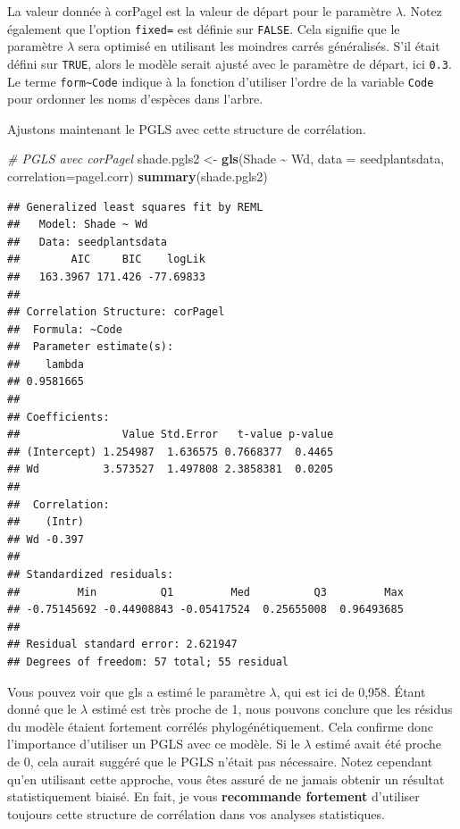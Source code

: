 \documentclass[
]{book}
\newenvironment{Shaded}{\begin{snugshade}}{\end{snugshade}}
\newcommand{\AttributeTok}[1]{\textcolor[rgb]{0.13,0.29,0.53}{#1}}
\newcommand{\CommentTok}[1]{\textcolor[rgb]{0.56,0.35,0.01}{\textit{#1}}}
\newcommand{\FunctionTok}[1]{\textcolor[rgb]{0.13,0.29,0.53}{\textbf{#1}}}
\newcommand{\NormalTok}[1]{#1}
\newcommand{\OtherTok}[1]{\textcolor[rgb]{0.56,0.35,0.01}{#1}}
\newcommand{\SpecialCharTok}[1]{\textcolor[rgb]{0.81,0.36,0.00}{\textbf{#1}}}
\begin{document}
La valeur donnée à corPagel est la valeur de départ pour le paramètre \(\lambda\). Notez également que l'option \texttt{fixed=} est définie sur \texttt{FALSE}. Cela signifie que le paramètre \(\lambda\) sera optimisé en utilisant les moindres carrés généralisés. S'il était défini sur \texttt{TRUE}, alors le modèle serait ajusté avec le paramètre de départ, ici \texttt{0.3}. Le terme \texttt{form\textasciitilde{}Code} indique à la fonction d'utiliser l'ordre de la variable \texttt{Code} pour ordonner les noms d'espèces dans l'arbre.

Ajustons maintenant le PGLS avec cette structure de corrélation.

\begin{Shaded}
\begin{Highlighting}[]
\CommentTok{\# PGLS avec corPagel}
\NormalTok{shade.pgls2 }\OtherTok{\textless{}{-}} \FunctionTok{gls}\NormalTok{(Shade }\SpecialCharTok{\textasciitilde{}}\NormalTok{ Wd, }\AttributeTok{data =}\NormalTok{ seedplantsdata, }\AttributeTok{correlation=}\NormalTok{pagel.corr)}
\FunctionTok{summary}\NormalTok{(shade.pgls2)}
\end{Highlighting}
\end{Shaded}

\begin{verbatim}
## Generalized least squares fit by REML
##   Model: Shade ~ Wd 
##   Data: seedplantsdata 
##        AIC     BIC    logLik
##   163.3967 171.426 -77.69833
## 
## Correlation Structure: corPagel
##  Formula: ~Code 
##  Parameter estimate(s):
##    lambda 
## 0.9581665 
## 
## Coefficients:
##                Value Std.Error   t-value p-value
## (Intercept) 1.254987  1.636575 0.7668377  0.4465
## Wd          3.573527  1.497808 2.3858381  0.0205
## 
##  Correlation: 
##    (Intr)
## Wd -0.397
## 
## Standardized residuals:
##         Min          Q1         Med          Q3         Max 
## -0.75145692 -0.44908843 -0.05417524  0.25655008  0.96493685 
## 
## Residual standard error: 2.621947 
## Degrees of freedom: 57 total; 55 residual
\end{verbatim}

Vous pouvez voir que gls a estimé le paramètre \(\lambda\), qui est ici de 0,958. Étant donné que le \(\lambda\) estimé est très proche de 1, nous pouvons conclure que les résidus du modèle étaient fortement corrélés phylogénétiquement. Cela confirme donc l'importance d'utiliser un PGLS avec ce modèle. Si le \(\lambda\) estimé avait été proche de 0, cela aurait suggéré que le PGLS n'était pas nécessaire. Notez cependant qu'en utilisant cette approche, vous êtes assuré de ne jamais obtenir un résultat statistiquement biaisé. En fait, je vous \textbf{recommande fortement} d'utiliser toujours cette structure de corrélation dans vos analyses statistiques.
\end{document}
